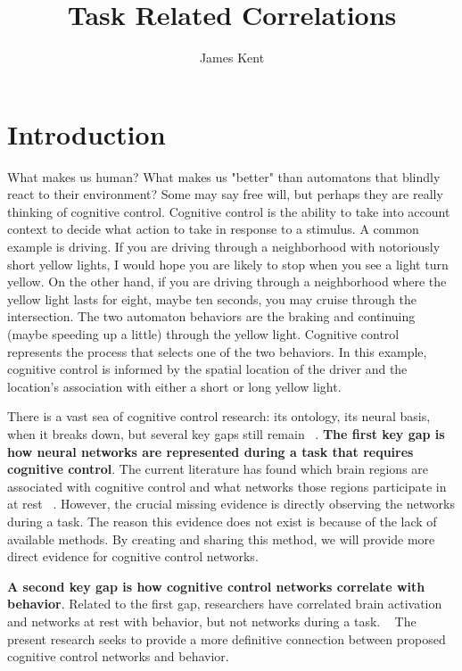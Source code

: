 \documentclass[phd,appendix,figures]{uithesis}
\title{Task Related Correlations}
\author{James Kent}
\begin{document}
\frontmatter

\chapter{Introduction}

What makes us human?
What makes us "better" than automatons that blindly react to their environment?
Some may say free will, but perhaps they are really thinking of cognitive control.
Cognitive control is the ability to take into account context to decide what action to take in response to a stimulus. 
A common example is driving.
If you are driving through a neighborhood with notoriously short yellow lights, I would hope you are likely to stop when you see a light turn yellow.
On the other hand, if you are driving through a neighborhood where the yellow light lasts for eight, maybe ten seconds, you may cruise through the intersection.
The two automaton behaviors are the braking and continuing (maybe speeding up a little) through the yellow light.
Cognitive control represents the process that selects one of the two behaviors.
In this example, cognitive control is informed by the spatial location of the driver and the location's association with either a short or long yellow light.

There is a vast sea of cognitive control research: its ontology, its neural basis, when it breaks down, but several key gaps still remain ~\citep{Gratton2017,Dosenbach2010,Braver2000}.
\textbf{The first key gap is how neural networks are represented during a task that requires cognitive control}.
The current literature has found which brain regions are associated with cognitive control and what networks those regions participate in at rest ~\citep{Gratton2017a,Lerman-Sinkoff2017,Herd2006,Rizio2012,Cooper2015,AppelBaum2014,Dosenbach2007}.
However, the crucial missing evidence is directly observing the networks during a task.
The reason this evidence does not exist is because of the lack of available methods.
By creating and sharing this method, we will provide more direct evidence for cognitive control networks.

\textbf{A second key gap is how cognitive control networks correlate with behavior}.
Related to the first gap, researchers have correlated brain activation and networks at rest with behavior, but not networks during a task. ~\citep{Nomura2010,Egner2004,Gonthier2016a,Braver2010,Huang2017}
The present research seeks to provide a more definitive connection between proposed cognitive control networks and behavior.
\end{document}
